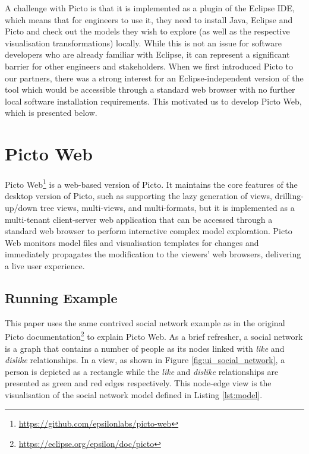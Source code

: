 \documentclass[sigconf,review]{acmart}
\begin{document}
A challenge with Picto is that it is implemented as a plugin of the Eclipse IDE, which means that for engineers to use it, they need to install Java, Eclipse and Picto and check out the models they wish to explore (as well as the respective visualisation transformations) locally. While this is not an issue for software developers who are already familiar with Eclipse, it can represent a significant barrier for other engineers and stakeholders. When we first introduced Picto to our partners, there was a strong interest for an Eclipse-independent version of the tool which would be accessible through a standard web browser with no further local software installation requirements. This motivated us to develop Picto Web, which is presented below.

\section{Picto Web}

Picto Web\footnote{\url{https://github.com/epsilonlabs/picto-web}} is a web-based version of Picto. 
It maintains the core features of the desktop version of Picto, such as supporting the lazy generation of views, drilling-up/down tree views, multi-views, and multi-formats, but it is implemented as a multi-tenant client-server web application that can be accessed through a standard web browser to perform interactive complex model exploration. 
Picto Web monitors model files and visualisation templates for changes and immediately propagates the modification to the viewers' web browsers, delivering a live user experience.

\subsection{Running Example}
\label{sec:running_example}

This paper uses the same contrived social network example as in the original Picto documentation\footnote{\url{https://eclipse.org/epsilon/doc/picto}} to explain Picto Web. As a brief refresher, a social network is a graph that contains a number of people as its nodes linked with \emph{like} and \emph{dislike} relationships. In a view, as shown in Figure \ref{fig:ui_social_network}, a person is depicted as a rectangle while the \emph{like} and \emph{dislike} relationships are presented as green and red edges respectively. This node-edge view is the visualisation of the social network model defined in Listing \ref{lst:model}.
\end{document}

